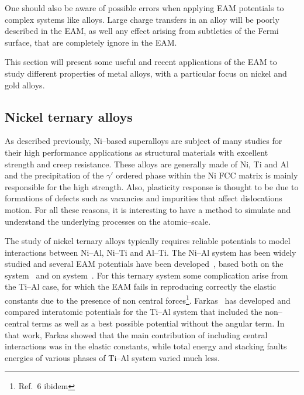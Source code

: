 One should also be aware of possible errors when applying EAM potentials to complex systems like alloys. Large charge transfers in an alloy will be poorly described in the EAM, as well any effect arising from subtleties of the Fermi surface, that are completely ignore in the EAM.

This section will present some useful and recent applications of the EAM to study different properties of metal alloys, with a particular focus on nickel and gold alloys.


\subsection{Nickel ternary alloys}
As described previously, Ni--based superalloys are subject of many studies for their high performance applications as structural materials with excellent strength and creep resistance. These alloys are generally made of Ni, Ti and Al and the precipitation of the $\gamma'$ ordered phase within the Ni FCC matrix is mainly responsible for the high strength. Also, plasticity response is thought to be due to formations of defects such as vacancies and impurities that affect dislocations motion. For all these reasons, it is interesting to have a method to simulate and understand the underlying processes on the atomic--scale.

The study of nickel ternary alloys typically requires reliable potentials to model interactions between Ni--Al, Ni--Ti and Al--Ti. The Ni--Al system has been widely studied and several EAM potentials have been developed~\cite{Pasianot1994:Farkas3}, based both on the  system~\cite{Foiles1987:Farkas5,Voter1987:Farkas4} and on  system~\cite{Farkas1995:Farkas7,Rao1991:Farkas6}. For this ternary system some complication arise from the Ti--Al case, for which the EAM fails in reproducing correctly the elastic constants due to the presence of non central forces\footnote{Ref.~6 ibidem}. Farkas~\cite{Farkas1994} has developed and compared interatomic potentials for the Ti--Al system that included the non--central terms as well as a best possible potential without the angular term. In that work, Farkas showed that the main contribution of including central interactions was in the elastic constants, while total energy and stacking faults energies of various phases of Ti--Al system varied much less.


